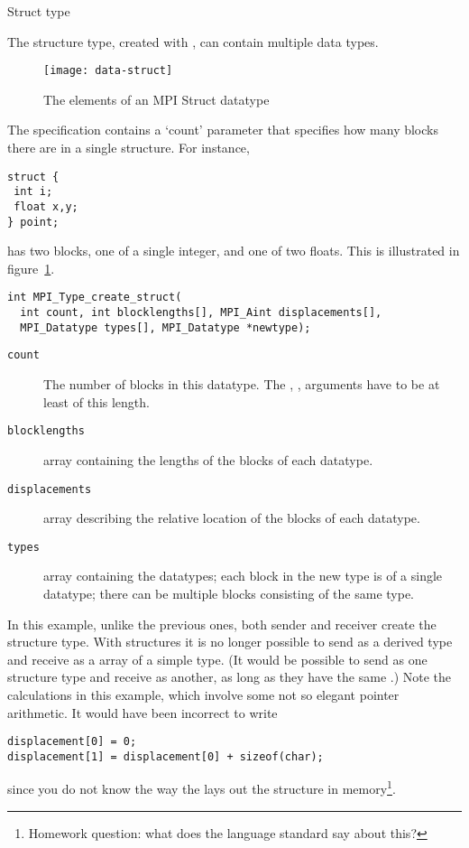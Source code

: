  {Struct type}
\label{sec:data:struct}

The structure type, created with ,
can contain multiple data types.
%
\begin{figure}[ht]
  \texttt{[image: data-struct]}
  \caption{The elements of an MPI Struct datatype}
  \label{fig:data-struct}
\end{figure}
%
The specification contains a `count' parameter that specifies how many blocks
there are in a single structure. For instance,
\begin{verbatim}
struct {
 int i;
 float x,y;
} point;
\end{verbatim}
has two blocks, one of a single integer, and one of two floats.
This is illustrated in figure~\ref{fig:data-struct}.

\begin{verbatim}
int MPI_Type_create_struct(
  int count, int blocklengths[], MPI_Aint displacements[],
  MPI_Datatype types[], MPI_Datatype *newtype);
\end{verbatim}

\begin{description}
\item[\texttt{count}] The number of blocks in this
  datatype. The , , 
  arguments have to be at least of this length.
\item[\texttt{blocklengths}] array containing the lengths of the blocks of each datatype.
\item[\texttt{displacements}] array describing the relative location
  of the blocks of each datatype.
\item[\texttt{types}] array containing the datatypes; each block in
  the new type is of a single datatype; there can be multiple
  blocks consisting of the same type.
\end{description}
In this example, unlike the previous ones, both sender and receiver
create the structure type. With structures it is no longer possible to
send as a derived type and receive as a array of a simple type.
(It would be possible to send as one structure type and receive as another, 
as long as they have the same .)
%
%
Note the  calculations in this example,
which involve some not so elegant pointer arithmetic.
It would have been incorrect to write
\begin{verbatim}
displacement[0] = 0;
displacement[1] = displacement[0] + sizeof(char);
\end{verbatim}
since you do not know the way the  lays out the
structure in memory\footnote{Homework question: what does the language
  standard say about this?}.

